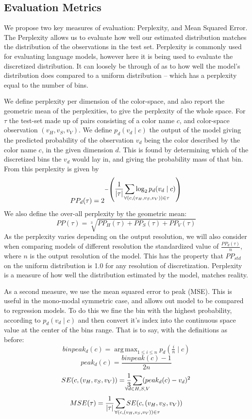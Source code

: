 \documentclass[11pt,letterpaper]{article}
\DeclareMathOperator*{\argmax}{arg\,max}
\begin{document}
\subsection{Evaluation Metrics}
We propose two key measures of evaluation: Perplexity, and Mean Squared Error.
The Perplexity allows us to evaluate how well our estimated distribution matches the distribution of the observations in the test set.
Perplexity is commonly used for evaluating language models, however here it is being used to evaluate the discretized distribution.
It can loosely be through of as to how well the model's distribution does compared to a uniform distribution -- which has a perplexity equal to the number of bins.


We define perplexity per dimension of the color-space, and also report the geometric mean of the perplexities, to give the perplexity of the whole space.
For $\tau$ the test-set made up of pairs consisting of a color name $c$, and color-space observation $(v_{H}, v_{S}, v_{V})$.
We define $p_{d}(v_{d}\mid c)$ the output of the model giving the predicted probability of the observation $v_{d}$ being the color described by the color name $c$, in the given dimension ${d}$.
This is found by determining which of the discretized bins the $v_{d}$ would lay in, and giving the probability mass of that bin.
From this perplexity is given by
\[
 PP_{d}(\tau) = 2^{-\left(
 	\displaystyle\frac{1}{|\tau|} 
 	\displaystyle\sum_{\mathclap{\qquad\qquad\quad
	 		\forall(c,(v_{H}, v_{S}, v_{V})) \in \tau}}
 	 \log_2 p_{d}(v_{d}\mid c)\right)}
\]
We also define the over-all perplexity by the geometric mean: 
\[
PP(\tau) = \sqrt[3]{PP_{H}(\tau)+PP_S(\tau)+PP_V(\tau)}
\]
As the perplexity varies depending on the output resolution,
we will also consider when comparing models of different resolution the standardized value of $\frac{PP_d(\tau)}{n}$, where $n$ is the output resolution of the model.
This has the property that $PP_{std}$ on the uniform distribution is 1.0 for any resolution of discretization.
Perplexity is a measure of how well the distribution estimated by the model, matches reality.


As a second measure, we use the mean squared error to peak (MSE).
This is useful in the mono-modal symmetric case, and allows out model to be compared to regression models.
To do this we fine the bin with the highest probability, according to $p_d(v_d\mid c)$ and then convert it's index into the continuous space value at the center of the bins range.
That is to say, with the definitions as before:
\[
binpeak_d(c)=\argmax_{1\le i \le n}{p_d\left(\tfrac{i}{n} \mid c\right)}
\]
\[
peak_d(c)=\frac{binpeak(c)-1}{2n}
\]
\[
SE(c, (v_{H}, v_{S}, v_{V})) = \frac{1}{3}
	\sum_{\mathclap{\forall d\in{H,S,V}}} (peak_d(c) - v_d)^2
\]
\[
MSE(\tau) =\frac{1}{|\tau|}
	\sum_{\mathclap{\qquad\qquad\quad
		\forall(c,(v_{H}, v_{S}, v_{V})) \in \tau}}
	 SE(c,(v_{H}, v_{S}, v_{V}))
\]
\end{document}
